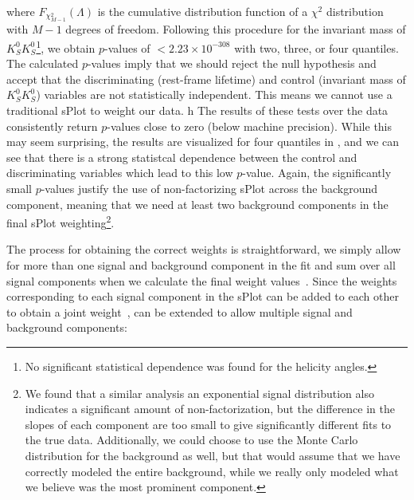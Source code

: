 where $F_{\chi^2_{M-1}}(\Lambda)$ is the cumulative distribution function of a $\chi^2$ distribution with $M-1$ degrees of freedom. Following this procedure for the invariant mass of $K_S^0K_S^0$\footnote{No significant statistical dependence was found for the helicity angles.}, we obtain $p$-values of $<2.23\times10^{-308}$ with two, three, or four quantiles. The calculated $p$-values imply that we should reject the null hypothesis and accept that the discriminating (rest-frame lifetime) and control (invariant mass of $K_S^0K_S^0$) variables are not statistically independent. This means we cannot use a traditional sPlot to weight our data.
                                                                                                                                                                                                                                                                                                                                                                                                                    h
The results of these tests over the data consistently return $p$-values close to zero (below machine precision). While this may seem surprising, the results are visualized for four quantiles in , and we can see that there is a strong statistcal dependence between the control and discriminating variables which lead to this low $p$-value. Again, the significantly small $p$-values justify the use of non-factorizing sPlot across the background component, meaning that we need at least two background components in the final sPlot weighting\footnote{We found that a similar analysis an exponential signal distribution also indicates a significant amount of non-factorization, but the difference in the slopes of each component are too small to give significantly different fits to the true data. Additionally, we could choose to use the Monte Carlo distribution for the background as well, but that would assume that we have correctly modeled the entire background, while we really only modeled what we believe was the most prominent component.}.

The process for obtaining the correct weights is straightforward, we simply allow for more than one signal and background component in the fit and sum over all signal components when we calculate the final weight values~\cite{dembinski_custom_2022}. Since the weights corresponding to each signal component in the sPlot can be added to each other to obtain a joint weight~\cite{pivk_splot_2005},  can be extended to allow multiple signal and background components:

